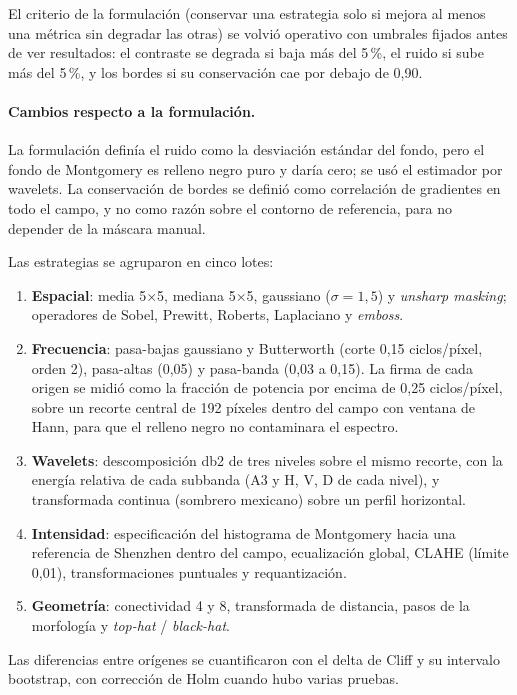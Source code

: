 El criterio de la formulación (conservar una estrategia solo si mejora al menos una
métrica sin degradar las otras) se volvió operativo con umbrales fijados antes de
ver resultados: el contraste se degrada si baja más del 5\,\%, el ruido si sube más
del 5\,\%, y los bordes si su conservación cae por debajo de 0,90.

\paragraph{Cambios respecto a la formulación.} La formulación definía el ruido
como la desviación estándar del fondo, pero el fondo de Montgomery es relleno negro
puro y daría cero; se usó el estimador por wavelets. La conservación de bordes se
definió como correlación de gradientes en todo el campo, y no como razón sobre el
contorno de referencia, para no depender de la máscara manual.

Las estrategias se agruparon en cinco lotes:

\begin{enumerate}
    \item \textbf{Espacial}: media 5$\times$5, mediana 5$\times$5, gaussiano
    ($\sigma = 1{,}5$) y \emph{unsharp masking}; operadores de Sobel, Prewitt,
    Roberts, Laplaciano y \emph{emboss}.
    \item \textbf{Frecuencia}: pasa-bajas gaussiano y Butterworth (corte 0,15
    ciclos/píxel, orden 2), pasa-altas (0,05) y pasa-banda (0,03 a 0,15). La
    firma de cada origen se midió como la fracción de potencia por encima de 0,25
    ciclos/píxel, sobre un recorte central de 192 píxeles dentro del campo con
    ventana de Hann, para que el relleno negro no contaminara el espectro.
    \item \textbf{Wavelets}: descomposición db2 de tres niveles sobre el mismo
    recorte, con la energía relativa de cada subbanda (A3 y H, V, D de cada nivel),
    y transformada continua (sombrero mexicano) sobre un perfil horizontal.
    \item \textbf{Intensidad}: especificación del histograma de Montgomery hacia
    una referencia de Shenzhen dentro del campo, ecualización global, CLAHE
    (límite 0,01), transformaciones puntuales y requantización.
    \item \textbf{Geometría}: conectividad 4 y 8, transformada de distancia, pasos
    de la morfología y \emph{top-hat} / \emph{black-hat}.
\end{enumerate}

Las diferencias entre orígenes se cuantificaron con el delta de Cliff y su
intervalo bootstrap, con corrección de Holm cuando hubo varias pruebas.

